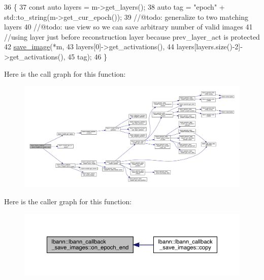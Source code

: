 \begin{DoxyCode}
36                                                       \{
37   \textcolor{keyword}{const} \textcolor{keyword}{auto} layers = m->get\_layers();
38   \textcolor{keyword}{auto} tag = \textcolor{stringliteral}{"epoch"} + std::to\_string(m->get\_cur\_epoch());
39   \textcolor{comment}{//@todo: generalize to two matching layers}
40   \textcolor{comment}{//@todo: use view so we can save arbitrary number of valid images}
41   \textcolor{comment}{//using layer just before reconstruction layer because prev\_layer\_act is protected}
42   \hyperlink{classlbann_1_1lbann__callback__save__images_ab84c4d511a4614ca90644d12dc77edee}{save\_image}(*m,
43              layers[0]->get\_activations(),
44              layers[layers.size()-2]->get\_activations(),
45              tag);
46 \}
\end{DoxyCode}
Here is the call graph for this function\+:\nopagebreak
\begin{figure}[H]
\begin{center}
\leavevmode
\includegraphics[width=350pt]{classlbann_1_1lbann__callback__save__images_aa540916eef9b95db68889a8a7426779c_cgraph}
\end{center}
\end{figure}
Here is the caller graph for this function\+:\nopagebreak
\begin{figure}[H]
\begin{center}
\leavevmode
\includegraphics[width=350pt]{classlbann_1_1lbann__callback__save__images_aa540916eef9b95db68889a8a7426779c_icgraph}
\end{center}
\end{figure}
\mbox{\label{classlbann_1_1lbann__callback__save__images_a4591438de0b52467988e2bd34b55c0dd}} 

